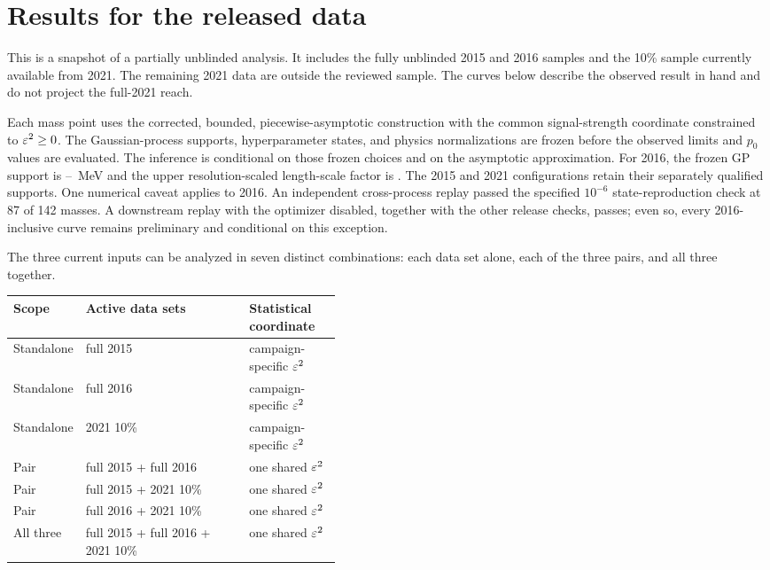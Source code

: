 \section{Results for the released data}
\label{sec:selected-observed-results}


This is a snapshot of a partially unblinded analysis. It includes the fully unblinded
2015 and 2016 samples and the 10\% sample currently available from 2021. The remaining 2021 data are outside the reviewed sample. The curves below
describe the observed result in hand and do not project the full-2021 reach.

Each mass point uses the corrected, bounded, piecewise-asymptotic \CLs{}
construction with the common signal-strength coordinate constrained to
$\varepsilon^2\geq 0$. The Gaussian-process supports, hyperparameter states, and physics
normalizations are frozen before the observed limits and $p_0$ values are evaluated.
The inference is conditional on those frozen choices and on
the asymptotic approximation. For 2016, the frozen GP support is
\FinalSixteenSupportLowMeV--\FinalSixteenSupportHighMeV~MeV and the upper
resolution-scaled length-scale factor is \FinalSixteenLengthScaleUpperFactor. The
2015 and 2021 configurations retain their separately qualified supports.
One numerical caveat applies to 2016. An independent cross-process replay passed the
specified $10^{-6}$ state-reproduction check at 87 of 142 masses. A downstream replay
with the optimizer disabled, together with the other release checks, passes; even so,
every 2016-inclusive curve remains preliminary and conditional on this exception.

The three current inputs can be analyzed in seven distinct combinations: each data set
alone, each of the three pairs, and all three together.

\begin{center}
\small
\begin{tabularx}{\linewidth}{@{}P{0.15\linewidth}Y P{0.28\linewidth}@{}}
\toprule
Scope & Active data sets & Statistical coordinate \\
\midrule
Standalone & full 2015 & campaign-specific $\varepsilon^2$ \\
Standalone & full 2016 & campaign-specific $\varepsilon^2$ \\
Standalone & 2021 10\% & campaign-specific $\varepsilon^2$ \\
Pair & full 2015 + full 2016 & one shared $\varepsilon^2$ \\
Pair & full 2015 + 2021 10\% & one shared $\varepsilon^2$ \\
Pair & full 2016 + 2021 10\% & one shared $\varepsilon^2$ \\
All three & full 2015 + full 2016 + 2021 10\% & one shared $\varepsilon^2$ \\
\bottomrule
\end{tabularx}
\end{center}


